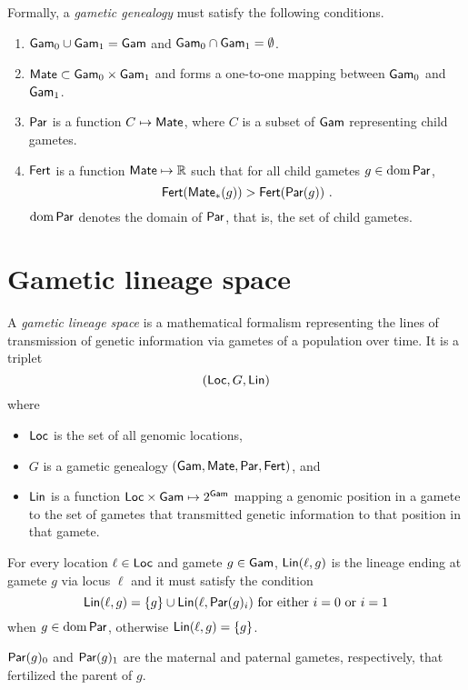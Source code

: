 \documentclass{article}
\begin{document}
Formally, a \emph{gametic genealogy} must satisfy the following
conditions.

\begin{enumerate}
\def\labelenumi{\arabic{enumi}.}
\item
  \(\mathsf{Gam}_0 \cup \mathsf{Gam}_1 = \mathsf{Gam}\) and \(\mathsf{Gam}_0 \cap \mathsf{Gam}_1 = \emptyset\).
\item
  \(\mathsf{Mate} \subset \mathsf{Gam}_0 \times \mathsf{Gam}_1\) and forms a one-to-one mapping
  between \(\mathsf{Gam}_0\) and \(\mathsf{Gam}_1\).
\item
  \(\mathsf{Par}\) is a function \(C \mapsto \mathsf{Mate}\), where \(C\) is a subset of
  \(\mathsf{Gam}\) representing child gametes.
\item
  \(\mathsf{Fert}\) is a function \(\mathsf{Mate} \mapsto \mathbb{R}\) such that for all
  child gametes \(g \in \operatorname{dom} \mathsf{Par}\), \[
  \mathsf{Fert}(\mathsf{Mate}_*(g)) > \mathsf{Fert}(\mathsf{Par}(g))
  \text{ .}
  \] \(\operatorname{dom} \mathsf{Par}\) denotes the domain of \(\mathsf{Par}\), that is, the set of
  child gametes.
\end{enumerate}

\section{Gametic lineage space}

A \emph{gametic lineage space} is a mathematical formalism representing
the lines of transmission of genetic information via gametes of a
population over time. It is a triplet \[
(\mathsf{Loc}, G, \mathsf{Lin}) 
\] where

\begin{itemize}
\item
  \(\mathsf{Loc}\) is the set of all genomic locations,
\item
  \(G\) is a gametic genealogy \((\mathsf{Gam}, \mathsf{Mate}, \mathsf{Par}, \mathsf{Fert})\), and
\item
  \(\mathsf{Lin}\) is a function \(\mathsf{Loc} \times \mathsf{Gam} \mapsto 2^{\mathsf{Gam}}\) mapping a
  genomic position in a gamete to the set of gametes that transmitted
  genetic information to that position in that gamete.
\end{itemize}

For every location \(\ell \in \mathsf{Loc}\) and gamete \(g \in \mathsf{Gam}\),
\(\mathsf{Lin}(\ell, g)\) is the lineage ending at gamete \(g\) via locus
\(\ell\) and it must satisfy the condition \[
\mathsf{Lin}(\ell, g) = \{g\} \cup \mathsf{Lin}(\ell, \mathsf{Par}(g)_i) \text{ for either $i=0$ or $i=1$}
\] when \(g \in \operatorname{dom} \mathsf{Par}\), otherwise \(\mathsf{Lin}(\ell, g) = \{g\}\).

\(\mathsf{Par}(g)_0\) and \(\mathsf{Par}(g)_1\) are the maternal and paternal gametes,
respectively, that fertilized the parent of \(g\).
\end{document}
